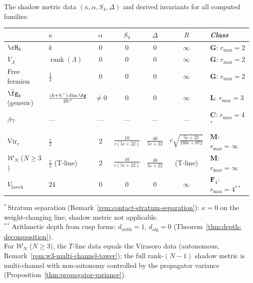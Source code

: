 \begin{example}
\label{ex:dichotomy-standard}
The shadow metric data $(\kappa, \alpha, S_4, \Delta)$ and
derived invariants for all computed families:
\begin{center}
\small
\renewcommand{\arraystretch}{1.25}
\begin{tabular}{@{}llccccl@{}}
\toprule
& $\kappa$ & $\alpha$ & $S_4$ & $\Delta$
  & $R$ & \emph{Class} \\
\midrule
$\cH_k$ & $k$ & $0$ & $0$ & $0$
  & $\infty$ & $\mathbf{G}$: $r_{\max} = 2$ \\
$V_\Lambda$ & $\operatorname{rank}(\Lambda)$ & $0$ & $0$ & $0$
  & $\infty$ & $\mathbf{G}$: $r_{\max} = 2$ \\
Free fermion & $\frac{1}{2}$ & $0$ & $0$ & $0$
  & $\infty$ & $\mathbf{G}$: $r_{\max} = 2$ \\[4pt]
$\hat{\fg}_k$ (generic) & $\frac{(k{+}h^\vee)\dim\fg}{2h^\vee}$
  & $\neq 0$ & $0$ & $0$
  & $\infty$ & $\mathbf{L}$: $r_{\max} = 3$ \\[4pt]
$\beta\gamma$ & --- & --- & --- & ---
  & --- & $\mathbf{C}$: $r_{\max} = 4$\;${}^*$ \\[4pt]
$\mathrm{Vir}_c$ & $\frac{c}{2}$ & $2$
  & $\frac{10}{c(5c{+}22)}$
  & $\frac{40}{5c{+}22}$
  & $c\sqrt{\frac{5c{+}22}{180c{+}872}}$
  & $\mathbf{M}$: $r_{\max} = \infty$ \\[4pt]
$\mathcal{W}_N$ ($N \geq 3$)
  & $\frac{c}{2}$ (T-line)
  & $2$ & $\frac{10}{c(5c{+}22)}$ & $\frac{40}{5c{+}22}$
  & (T-line)
  & $\mathbf{M}$: $r_{\max} = \infty$ \\[4pt]
$V_{\mathrm{Leech}}$ & $24$ & $0$ & $0$ & $0$
  & $\infty$ & $\mathbf{F}_4$: $r_{\max} = 4$\;${}^{**}$ \\
\bottomrule
\end{tabular}
\end{center}
\noindent
${}^*$\,Stratum separation (Remark~\ref{rem:contact-stratum-separation}): $\kappa = 0$ on the weight-changing line; shadow metric not applicable.\\
${}^{**}$\,Arithmetic depth from cusp forms: $d_{\mathrm{arith}} = 1$, $d_{\mathrm{alg}} = 0$ (Theorem~\ref{thm:depth-decomposition}).\\
For $\mathcal{W}_N$ ($N \geq 3$), the $T$-line data equals the Virasoro data (autonomous, Remark~\ref{rem:w3-multi-channel-tower}); the full rank-$(N{-}1)$ shadow metric is multi-channel with non-autonomy controlled by the propagator variance (Proposition~\ref{thm:propagator-variance}).
\end{example}


